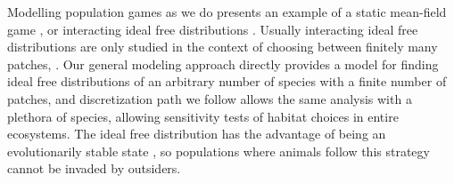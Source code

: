 



Modelling population games as we do presents an example of a static mean-field game \citep{lasry2007mean}, or interacting ideal free distributions \citep{cressman2004ideal}. Usually interacting ideal free distributions are only studied in the context of choosing between finitely many patches, \citep{kvrivan2008ideal}. Our general modeling approach directly provides a model for finding ideal free distributions of an arbitrary number of species with a finite number of patches, and discretization path we follow allows the same analysis with a plethora of species, allowing sensitivity tests of habitat choices in entire ecosystems. The ideal free distribution has the advantage of being an evolutionarily stable state \citep{cressman2010ideal, kvrivan2009evolutionary}, so populations where animals follow this strategy cannot be invaded by outsiders.



